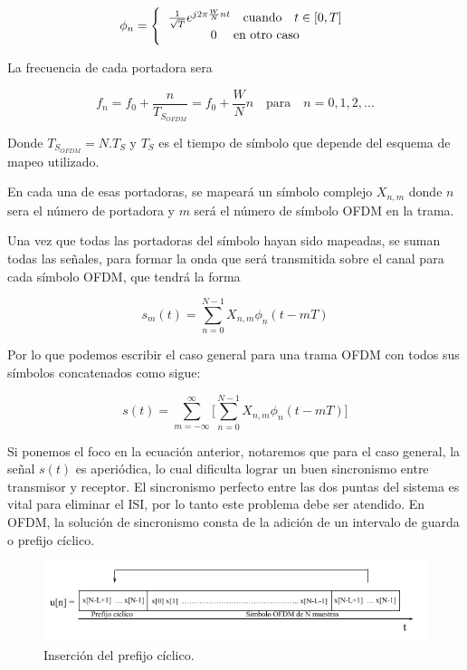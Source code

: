\begin{equation*}
		\phi_{n} =
		\left \{
			\begin{tabular}{c}
 				$\frac{1}{\sqrt{T}}e^{j2\pi\frac{W}{N}nt}\quad\text{cuando}\quad t \in [0,T] $ \\ 
 				0 \quad \text{en otro caso} 
			\end{tabular}
		\right.
\end{equation*}

La frecuencia de cada portadora sera 

\begin{equation*}
	f_n = f_0 + \frac{n}{T_{S_{OFDM}}} = f_0 + \frac{W}{N}n \quad\text{para}\quad n = 0,1,2,... 
\end{equation*}
	
Donde $T_{S_{OFDM}} = N.T_S$ y $T_S$ es el tiempo de símbolo que depende del esquema de mapeo utilizado.

En cada una de esas portadoras, se mapeará un símbolo complejo $X_{n,m}$ donde $n$ sera el número de portadora y $m$ será el número de símbolo OFDM en la trama. 

Una vez que todas las portadoras del símbolo hayan sido mapeadas, se suman todas las señales, para formar la onda que será transmitida sobre el canal para cada símbolo OFDM, que tendrá la forma

\begin{equation*}
	s_m(t) = \sum_{n = 0}^{N - 1} X_{n,m} \phi_{n}(t - mT)
\end{equation*}

Por lo que podemos escribir el caso general para una trama OFDM con todos sus símbolos concatenados como sigue:

\begin{equation*}
s(t) = \sum_{m = -\infty}^{\infty}\Big[\sum_{n = 0}^{N - 1} X_{n,m} \phi_{n}(t - mT)\Big]
\end{equation*}

Si ponemos el foco en la ecuación anterior, notaremos que para el caso general, la señal $s(t)$ es aperiódica, lo cual dificulta lograr un buen sincronismo entre transmisor y receptor. El sincronismo perfecto entre las dos puntas del sistema es vital para eliminar el ISI, por lo tanto este problema debe ser atendido. En OFDM, la solución de sincronismo consta de la adición de un intervalo de guarda o prefijo cíclico. 

\begin{figure}[h!]
	\centering
	\includegraphics[scale=0.65]{figuras/cap03/prefijo_ciclico}
	\caption{\label{f:prefijo_ciclico} Inserción del prefijo cíclico.}
\end{figure}

